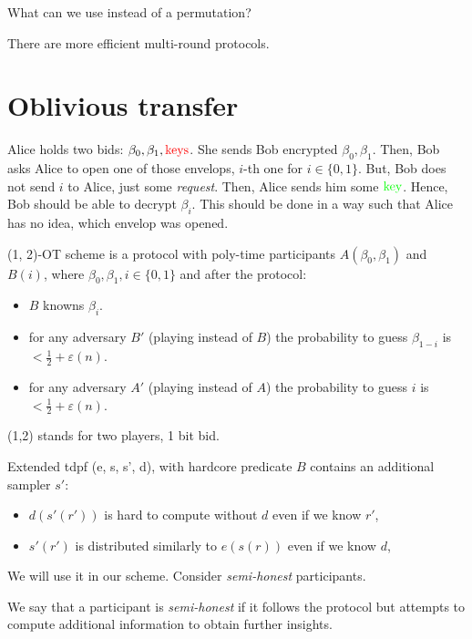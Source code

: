 \begin{exercise}
    What can we use instead of a permutation?
\end{exercise}

\begin{remark}
    There are more efficient multi-round protocols.
\end{remark}

\section{Oblivious transfer} \label{sec:oblivious_transfer}

Alice holds two bids: $\beta_0, \beta_1, \textcolor{red}{\text{keys}}$.
She sends Bob encrypted $\beta_0, \beta_1$.
Then, Bob asks Alice to open one of those envelops, $i$-th one for $i \in \{0, 1\}$.
But, Bob does not send $i$ to Alice, just some \textit{request}.
Then, Alice sends him some $\textcolor{green}{\text{key}}$.
Hence, Bob should be able to decrypt $\beta_i$.
This should be done in a way such that Alice has no idea, which envelop was opened.

\begin{definition}[(1,2)-OT]
    (1, 2)-OT scheme is a protocol with poly-time participants $A(\beta_0, \beta_1)$ and $B(i)$, where $\beta_0, \beta_1, i \in \{0, 1\}$ and after the protocol:
    \begin{itemize}
        \item $B$ knowns $\beta_i$.
	\item for any adversary $B'$ (playing instead of $B$) the probability to guess $\beta_{1 - i}$ is $< \frac{1}{2} + \varepsilon(n)$.
	\item for any adversary $A'$ (playing instead of $A$) the probability to guess $i$ is $< \frac{1}{2} + \varepsilon(n)$.
    \end{itemize}
\end{definition}
(1,2) stands for two players, 1 bit bid.

\begin{definition}
    Extended tdpf (e, s, s', d), with hardcore predicate $B$ contains an additional sampler $s'$:
    \begin{itemize}
        \item $d(s'(r'))$ is hard to compute without $d$ even if we know $r'$,
	\item $s'(r')$ is distributed similarly to $e(s(r))$ even if we know $d$,
    \end{itemize}
\end{definition}
We will use it in our scheme.
Consider \emph{semi-honest} participants.
\begin{definition} \label{df:semi_honest}
    We say that a participant is \emph{semi-honest} if it follows the protocol but attempts to compute additional information to obtain further insights.
\end{definition}

